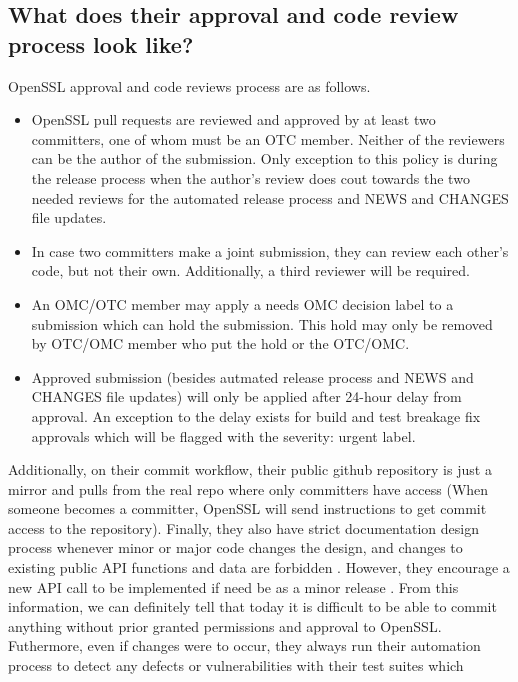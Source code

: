 \documentclass[conference]{IEEEtran}
\begin{document}
\subsection{What does their approval and code review process look like?}
    OpenSSL approval and code reviews process are as follows.
    \begin{itemize}
        \item OpenSSL pull requests are reviewed and approved by at least two committers, one of
        whom must be an OTC member. Neither of the reviewers can be the author of the submission\cite{7}.
        Only exception to this policy is during the release process when the author's review does
        cout towards the two needed reviews for the automated release process and NEWS and CHANGES
        file updates\cite{7}.
        \item In case two committers make a joint submission, they can review each other's
        code, but not their own. Additionally, a third reviewer will be required\cite{7}.
        \item An OMC/OTC member may apply a needs OMC decision label to a submission which
        can hold the submission. This hold may only be removed by OTC/OMC member who
        put the hold or the OTC/OMC\cite{7}.
        \item Approved submission (besides autmated release process and NEWS and CHANGES
        file updates) will only be applied
        after 24-hour delay from approval. An exception to the delay exists
        for build and test breakage fix approvals which will be flagged with the
        severity: urgent label\cite{7}.
    \end{itemize}
    Additionally, on their commit workflow, their public github repository is just a mirror
    and pulls from the real repo where only committers have
    access\cite{7} (When someone becomes a committer, OpenSSL will
    send instructions to get commit access to the repository\cite{7}). 
    Finally, they also have strict documentation design process whenever 
    minor or major code changes the design, and
    changes to existing public API functions and data are forbidden
    \cite{9}. However, they encourage a new API call to be implemented
    if need be as a minor release \cite{9}. From this information, we
    can definitely tell that today it is difficult to be able to commit
    anything without prior granted permissions and approval to OpenSSL. Futhermore,
    even if changes were to occur, they always run their automation
    process to detect any defects or vulnerabilities with their test suites which
\end{document}
